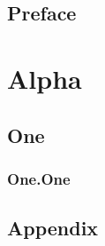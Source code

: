 \documentclass{memoir}
\begin{document}
\frontmatter


\chapter{Preface}

\lipsum

\tableofcontents

\mainmatter

\part{Alpha}

\chapter{One}

\section{One.One}

\lipsum

\backmatter

\chapter{Appendix}

\lipsum
\end{document}
